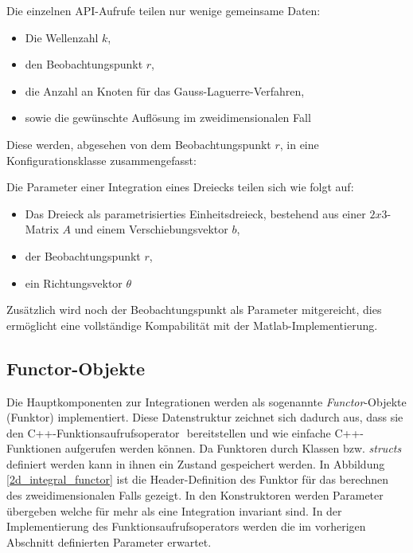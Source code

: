 Die einzelnen API-Aufrufe teilen nur wenige gemeinsame Daten:
\begin{itemize}
    \item Die Wellenzahl $k$,
    \item den Beobachtungspunkt $r$,
    \item die Anzahl an Knoten für das Gauss-Laguerre-Verfahren,
    \item sowie die gewünschte Auflösung im zweidimensionalen Fall
\end{itemize}
Diese werden, abgesehen von dem Beobachtungspunkt $r$, in eine Konfigurationsklasse zusammengefasst:

\begin{center}
    
    \label{configuration}
\end{center}


Die Parameter einer Integration eines Dreiecks teilen sich wie folgt auf:

\begin{itemize}
    \item Das Dreieck als parametrisierties Einheitsdreieck, bestehend aus einer $2x3$-Matrix $A$ und einem Verschiebungsvektor $b$,
    \item der Beobachtungspunkt $r$,
    \item ein Richtungsvektor $\theta$
\end{itemize}

Zusätzlich wird noch der Beobachtungspunkt als Parameter mitgereicht, dies ermöglicht eine vollständige Kompabilität mit der Matlab-Implementierung.

\subsection{Functor-Objekte}\label{sec_functor}

Die Hauptkomponenten zur Integrationen werden als sogenannte \textit{Functor}-Objekte (Funktor) implementiert.
Diese Datenstruktur zeichnet sich dadurch aus, dass sie den C++-Funktionsaufrufsoperator \textit{\(\)} bereitstellen und wie einfache C++-Funktionen aufgerufen werden können.
Da Funktoren durch Klassen bzw. \textit{structs} definiert werden kann in ihnen ein Zustand gespeichert werden.
In Abbildung \ref{2d_integral_functor} ist die Header-Definition des Funktor für das berechnen des zweidimensionalen Falls gezeigt.
In den Konstruktoren werden Parameter übergeben welche für mehr als eine Integration invariant sind. In der Implementierung des Funktionsaufrufsoperators werden die im vorherigen Abschnitt definierten Parameter erwartet.

\begin{center}
    
    \label{2d_integral_functor}
\end{center}
